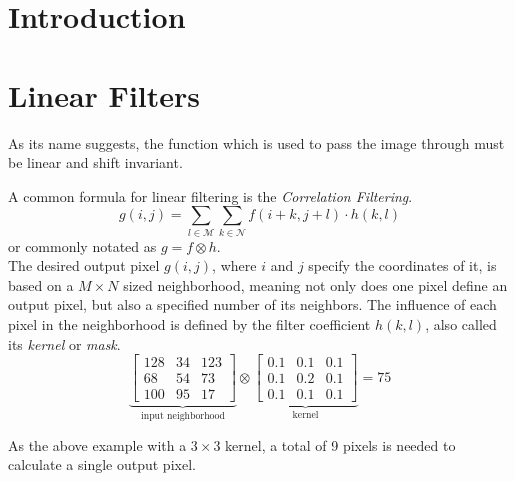 \documentclass[twoside,a4paper,article]{combine}
\begin{document}


\begin{abstract}
\end{abstract}

\tableofcontents
\newpage

\section{Introduction}
\section{Linear Filters}
As its name suggests, the function which is used to pass the image through
must be linear and shift invariant.

A common formula for linear filtering is the \emph{Correlation Filtering}.
\[
    g(i,j) = \sum_{l \in \mathscr{M}}\sum_{k \in \mathscr{N}}{f(i+k, j+l) \cdot h(k, l)}
\]
or commonly notated as $g = f \otimes h$.\hfill\\

The desired output pixel $g(i, j)$, where $i$ and $j$ specify the
coordinates of it, is based on a $M \times N$ sized neighborhood, 
meaning not only does one pixel define an output pixel, but also a specified number
of its neighbors. The influence of each pixel in the neighborhood is defined by the filter coefficient $h(k, l)$,
also called its \emph{kernel} or \emph{mask}.\\

$$
\underbrace{
    \begin{bmatrix}
        128 & 34 & 123\\
        68 & 54 & 73 \\
        100 & 95 & 17
    \end{bmatrix}}_{\text{input neighborhood}}
\otimes
\underbrace{
    \begin{bmatrix}
        0.1 & 0.1 & 0.1\\
        0.1 & 0.2 & 0.1\\
        0.1 & 0.1 & 0.1
    \end{bmatrix}}_{\text{kernel}}
= 75
$$

As the above example with a $3 \times 3$ kernel, a total of 9 pixels is needed to calculate a single output pixel.\\
\end{document}
